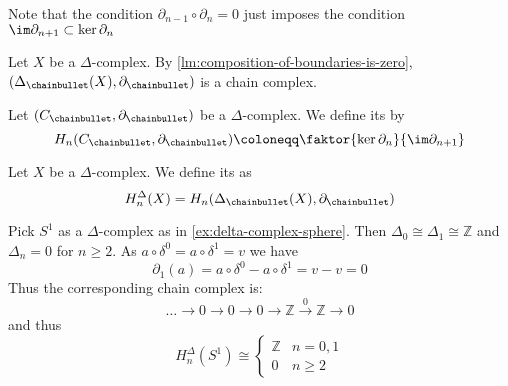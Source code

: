 \begin{remark*}
    Note that the condition $\partial_{n-1} \circ  \partial_n = 0$ just imposes the condition $\im \partial_{n+1} \subset \ker \partial_n$
\end{remark*}

\begin{example}\label{ex:homology-groups-are-delta-complex}
    Let $X$ be a  $\Delta$-complex. By \autoref{lm:composition-of-boundaries-is-zero}, $(\Delta_{\chainbullet }(X),\partial_{\chainbullet })$ is a chain complex.
\end{example}

\begin{definition}\label{def:homology-group}
Let $(C_{\chainbullet},\partial_{\chainbullet })$ be a $\Delta$-complex. We define its  by
    \[
    H_n(C_{\chainbullet} ,\partial_{\chainbullet }) \coloneqq  \faktor{\ker \partial_n}{\im \partial_{n+1}}
    \] 
\end{definition}

\begin{definition}
    Let $X$ be a  $\Delta$-complex. We define its  as 
    \[
        H_n^{\Delta} (X) = H_n(\Delta_{\chainbullet }(X),\partial_{\chainbullet })
    \] 
\end{definition}

\begin{example}
Pick $S^1$ as a $\Delta$-complex as in \autoref{ex:delta-complex-sphere}. Then $\Delta_0 \cong \Delta_1 \cong \mathbb{Z}$ and $\Delta_n = 0$ for $n\geq 2$. As $a \circ  δ^0 = a \circ  δ^1 = v$ we have
\[
    \partial_1(a) = a \circ  δ^0 - a \circ  δ^1 = v - v = 0
\] 
Thus the corresponding chain complex is:
\[
\ldots \to  0 \to  0 \to  0 \to  \mathbb{Z} \stackrel{0}{\longrightarrow} \mathbb{Z} \to  0
\] 
and thus
\[
    H_n^{\Delta}(S^1) \cong \begin{cases}
        \mathbb{Z} & n = 0,1 \\
        0 & n\geq 2
    \end{cases}
\] 
\end{example}
